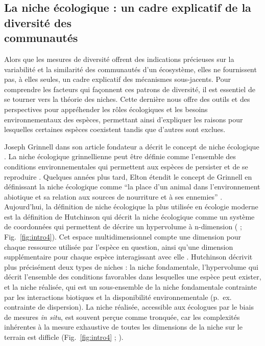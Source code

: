 \begin{refsection}
{\subsection{La niche écologique : un cadre explicatif de la diversité
des \\
communautés}\label{la-niche-uxe9cologique-un-cadre-explicatif-de-la-diversituxe9-des-communautuxe9s}}

Alors que les mesures de diversité offrent des indications précieuses
sur la variabilité et la similarité des communautés d'un écosystème,
elles ne fournissent pas, à elles seules, un cadre explicatif des
mécanismes sous-jacents. Pour comprendre les facteurs qui façonnent ces
patrons de diversité, il est essentiel de se tourner vers la théorie des
niches. Cette dernière nous offre des outils et des perspectives pour
appréhender les rôles écologiques et les besoins environnementaux des
espèces, permettant ainsi d'expliquer les raisons pour lesquelles
certaines espèces coexistent tandis que d'autres sont exclues.

Joseph Grinnell dans son article fondateur a décrit le concept de niche
écologique \autocite{Grinnell_1917}. La niche écologique grinnellienne
peut être définie comme l'ensemble des conditions environnementales qui
permettent aux espèces de persister et de se reproduire
\autocite{Grinnell_1917}. Quelques années plus tard, Elton étendit le
concept de Grinnell en définissant la niche écologique comme ``la place
d'un animal dans l'environnement abiotique et sa relation aux sources de
nourriture et à ses ennemies'' \autocite{Elton_1927}. Aujourd'hui, la
définition de niche écologique la plus utilisée en écologie moderne est
la définition de Hutchinson qui décrit la niche écologique comme un
système de coordonnées qui permettent de décrire un hypervolume à
n-dimension (\textcite{Hutchinson_1957} ; Fig.~\ref{fig:intro4}). Cet
espace multidimensionnel compte une dimension pour chaque ressource
utilisée par l'espèce en question, ainsi qu'une dimension supplémentaire
pour chaque espèce interagissant avec elle \autocite{Hutchinson_1957}.
Hutchinson décrivit plus précisément deux types de niches : la niche
fondamentale, l'hypervolume qui décrit l'ensemble des conditions
favorables dans lesquelles une espèce peut exister, et la niche
réalisée, qui est un sous-ensemble de la niche fondamentale contrainte
par les interactions biotiques et la disponibilité environnementale
(p.~ex. contrainte de dispersion). La niche réalisée, accessible aux
écologues par le biais de mesures \emph{in situ}, est souvent perçue
comme tronquée, car les complexités inhérentes à la mesure exhaustive de
toutes les dimensions de la niche sur le terrain est difficle
(Fig.~\ref{fig:intro4} ; \textcite{Chevalier_2022}).


\end{refsection}
